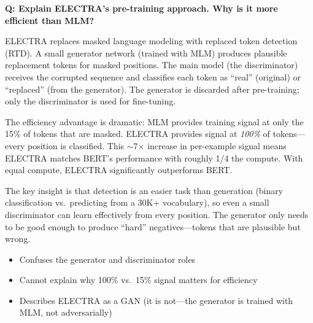 \begin{interviewq}
\end{interviewq}

\bigskip

\begin{interviewq}
\textbf{Q: Explain ELECTRA's pre-training approach. Why is it more efficient than MLM?}

 \quad {} \quad \badgefreq{\freqmed}

\stronganswer
ELECTRA replaces masked language modeling with replaced token detection (RTD).
A small generator network (trained with MLM) produces plausible replacement tokens
for masked positions.  The main model (the discriminator) receives the corrupted
sequence and classifies each token as ``real'' (original) or ``replaced'' (from the
generator).  The generator is discarded after pre-training; only the discriminator
is used for fine-tuning.

The efficiency advantage is dramatic: MLM provides training signal at only the 15\%
of tokens that are masked.  ELECTRA provides signal at \emph{100\%} of tokens---
every position is classified.  This $\sim$7$\times$ increase in per-example signal
means ELECTRA matches BERT's performance with roughly 1/4 the compute.  With equal
compute, ELECTRA significantly outperforms BERT.

The key insight is that detection is an easier task than generation (binary
classification vs.\ predicting from a 30K+ vocabulary), so even a small discriminator
can learn effectively from every position.  The generator only needs to be good
enough to produce ``hard'' negatives---tokens that are plausible but wrong.

\redflags
\begin{itemize}
    \item Confuses the generator and discriminator roles
    \item Cannot explain why 100\% vs.\ 15\% signal matters for efficiency
    \item Describes ELECTRA as a GAN (it is not---the generator is trained with MLM,
          not adversarially)
\end{itemize}



\end{interviewq}
